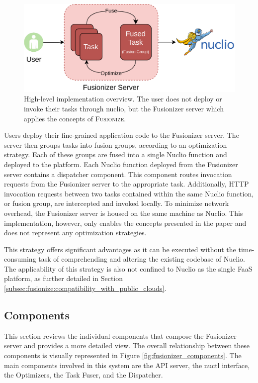 \begin{figure}
    \centering
    \includegraphics[width=\linewidth]{figures/fusionizer_highlvl}
    \caption{
        High-level implementation overview. The user does not deploy or invoke
        their tasks through nuclio, but the Fusionizer server which applies the
        concepts of \textsc{Fusionize}.
    }
    \label{fig:fusionizer_highlvl}
\end{figure}

Users deploy their fine-grained application code to the Fusionizer server. The
server then groups tasks into fusion groups, according to an optimization
strategy. Each of these groups are fused into a single Nuclio function and
deployed to the platform. Each Nuclio function deployed from the Fusionizer
server contains a dispatcher component. This component routes invocation
requests from the Fusionizer server to the appropriate task. Additionally, HTTP
invocation requests between two tasks contained within the same Nuclio function,
or fusion group, are intercepted and invoked locally. To minimize network
overhead, the Fusionizer server is housed on the same machine as Nuclio. This
implementation, however, only enables the concepts presented in the paper and
does not represent any optimization strategies.

This strategy offers significant advantages as it can be executed without the
time-consuming task of comprehending and altering the existing codebase of
Nuclio. The applicability of this strategy is also not confined to Nuclio as the
single FaaS platform, as further detailed in Section
\ref{subsec:fusionize:compatibility_with_public_clouds}.

\subsection{Components}

This section reviews the individual components that compose the Fusionizer
server and provides a more detailed view. The overall relationship between these
components is visually represented in Figure \ref{fig:fusionizer_components}.
The main components involved in this system are the API server, the nuctl
interface, the Optimizers, the Task Fuser, and the Dispatcher.

